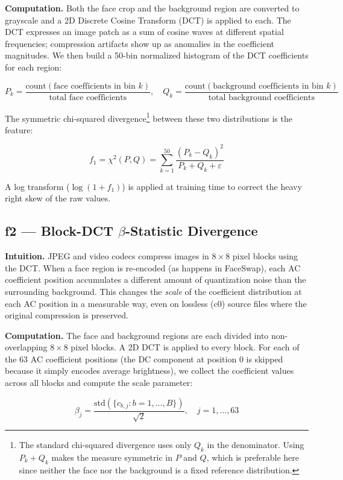\documentclass{article}
\begin{document}
\textbf{Computation.} Both the face crop and the background region are converted to grayscale and a 2D Discrete Cosine Transform (DCT) is applied to each. The DCT expresses an image patch as a sum of cosine waves at different spatial frequencies; compression artifacts show up as anomalies in the coefficient magnitudes. We then build a 50-bin normalized histogram of the DCT coefficients for each region:

\[
  P_k = \frac{\text{count}(\text{face coefficients in bin } k)}{\text{total face coefficients}}, \quad
  Q_k = \frac{\text{count}(\text{background coefficients in bin } k)}{\text{total background coefficients}}
\]

The symmetric chi-squared divergence\footnote{The standard chi-squared divergence uses only $Q_k$ in the denominator. Using $P_k + Q_k$ makes the measure symmetric in $P$ and $Q$, which is preferable here since neither the face nor the background is a fixed reference distribution.} between these two distributions is the feature:

\[
  f_1 = \chi^2(P, Q) = \sum_{k=1}^{50} \frac{(P_k - Q_k)^2}{P_k + Q_k + \varepsilon}
\]

A log transform ($\log(1 + f_1)$) is applied at training time to correct the heavy right skew of the raw values.

\subsection*{f2 — Block-DCT $\beta$-Statistic Divergence}

\textbf{Intuition.} JPEG and video codecs compress images in $8\times 8$ pixel blocks using the DCT. When a face region is re-encoded (as happens in FaceSwap), each AC coefficient position accumulates a different amount of quantization noise than the surrounding background. This changes the \textit{scale} of the coefficient distribution at each AC position in a measurable way, even on lossless (c0) source files where the original compression is preserved.

\textbf{Computation.} The face and background regions are each divided into non-overlapping $8\times8$ pixel blocks. A 2D DCT is applied to every block. For each of the 63 AC coefficient positions (the DC component at position 0 is skipped because it simply encodes average brightness), we collect the coefficient values across all blocks and compute the scale parameter:

\[
  \beta_j = \frac{\text{std}(\{c_{b,j} : b = 1,\ldots,B\})}{\sqrt{2}}, \quad j = 1, \ldots, 63
\]
\end{document}
